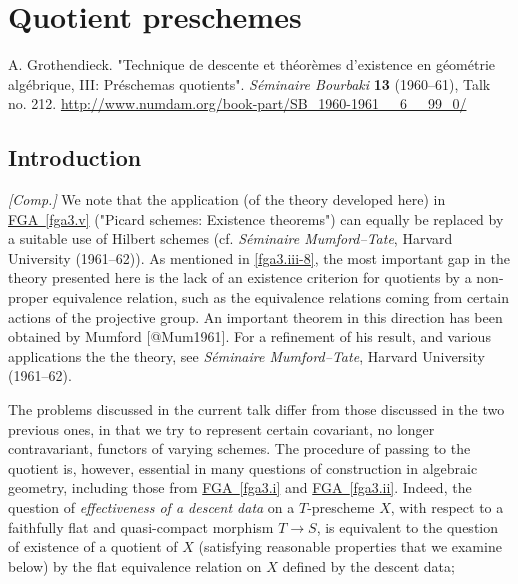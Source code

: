 \part{Quotient preschemes}\label{fga3.iii}\thispagestyle{fancy}\begin{original}{}\label{fga3.iii-original-citation}\skipsinglepar\par{}A. Grothendieck.
    "Technique de descente et théorèmes d'existence en géométrie algébrique, III: Préschemas quotients".
    \emph{Séminaire Bourbaki} \textbf{13} (1960–61), Talk no. 212.
    \url{http://www.numdam.org/book-part/SB_1960-1961__6__99_0/}\end{original}\chapter{Introduction}\thispagestyle{fancy}\label{fga3.iii-introduction}\begin{remark}{}\label{fga3.iii-introduction-remark}\skipsinglepar\par{}\emph{[Comp.]}
    We note that the application (of the theory developed here) in \hyperref[fga3.v]{FGA~\ref*{fga3.v}} ("Picard schemes: Existence theorems") can equally be replaced by a suitable use of Hilbert schemes (cf. \emph{Séminaire Mumford–Tate}, Harvard University (1961–62)).
    As mentioned in \cref{fga3.iii-8}, the most important gap in the theory presented here is the lack of an existence criterion for quotients by a non-proper equivalence relation, such as the equivalence relations coming from certain actions of the projective group.
    An important theorem in this direction has been obtained by Mumford [@Mum1961].
    For a refinement of his result, and various applications the the theory, see \emph{Séminaire Mumford–Tate}, Harvard University (1961–62).\end{remark}\par{}The problems discussed in the current talk differ from those discussed in the two previous ones, in that we try to represent certain covariant, no longer contravariant, functors of varying schemes.
  The procedure of passing to the quotient is, however, essential in many questions of construction in algebraic geometry, including those from \hyperref[fga3.i]{FGA~\ref*{fga3.i}} and \hyperref[fga3.ii]{FGA~\ref*{fga3.ii}}.
  Indeed, the question of \emph{effectiveness of a descent data} on a \(T\)-prescheme \(X\), with respect to a faithfully flat and quasi-compact morphism \(T\to  S\), is equivalent to the question of existence of a quotient of \(X\) (satisfying reasonable properties that we examine below) by the flat equivalence relation on \(X\) defined by the descent data;
